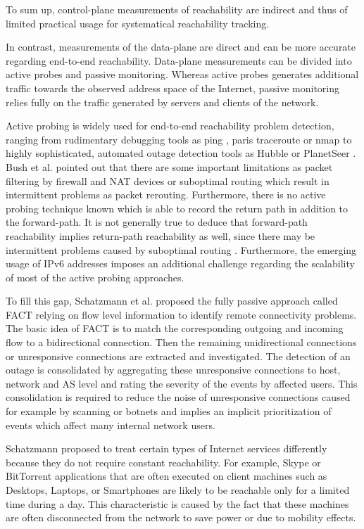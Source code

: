 \documentclass{sigcomm-alternate}
\begin{document}
To sum up, control-plane measurements of reachability are indirect
and thus of limited practical usage for systematical reachability
tracking.

In contrast, measurements of the data-plane are direct and can be
more accurate regarding end-to-end reachability. Data-plane
measurements can be divided into active probes and passive monitoring.
Whereas active probes generates additional traffic towards the
observed address space of the Internet, passive monitoring relies
fully on the traffic generated by servers and clients of the network.

Active probing is widely used for end-to-end reachability problem
detection, ranging from rudimentary debugging tools as ping
\cite{PING}, paris traceroute \cite{traceroute} or nmap \cite{Nmap}
to highly sophisticated, automated outage detection tools as Hubble
\cite{Katz:2008} or PlanetSeer \cite{Zhang:2004}. Bush et al.\cite{Bush:Optometry}
pointed out that there are some important limitations as packet filtering
by firewall and NAT devices or suboptimal routing which result in
intermittent problems as packet rerouting. Furthermore, there is
no active probing technique known which is able to record the return
path in addition to the forward-path. It is not generally true to
deduce that forward-path reachability implies return-path reachability
as well, since there may be intermittent problems caused by suboptimal
routing \cite{Bush:Optometry}. Furthermore, the emerging usage of IPv6
addresses imposes an additional challenge regarding the scalability of
most of the active probing approaches.

To fill this gap, Schatzmann et al. proposed the fully
passive approach called FACT\cite{SchatzmannPAM2011} relying on flow level information to
identify remote connectivity problems. The basic idea of FACT is to
match the corresponding outgoing and incoming flow to a bidirectional
connection. Then the remaining unidirectional connections or unresponsive
connections are extracted and investigated. The detection of an outage
is consolidated by aggregating these unresponsive connections to host,
network and AS level and rating the severity of the events by affected
users. This consolidation is required to reduce the noise of unresponsive
connections caused for example by scanning or botnets and implies an
implicit prioritization of events which affect many internal network
users.

Schatzmann\cite{SchatzmanThesis2012} proposed to treat certain types 
of Internet services differently because they do not require constant 
reachability. For example, Skype or BitTorrent applications that
are often executed on client machines such as Desktops, Laptops, or
Smartphones are likely to be reachable only for a limited time during a day.
This characteristic is caused by the fact that these machines are often
disconnected from the network to save power or due to mobility effects.
\end{document}
